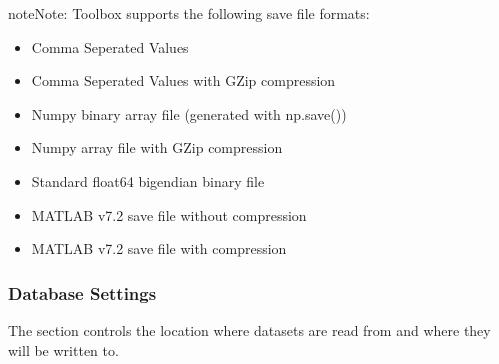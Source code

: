 \documentclass[letterpaper,10pt,english]{sphinxmanual}
\begin{document}
\begin{sphinxadmonition}{note}{Note:}
\sphinxAtStartPar
Toolbox supports the following save file formats:
\begin{itemize}
\item {} 
\sphinxAtStartPar
{} \sphinxhyphen{} Comma Seperated Values

\item {} 
\sphinxAtStartPar
{} \sphinxhyphen{} Comma Seperated Values with G\sphinxhyphen{}Zip compression

\item {} 
\sphinxAtStartPar
{} \sphinxhyphen{} Numpy binary array file (generated with np.save())

\item {} 
\sphinxAtStartPar
{} \sphinxhyphen{} Numpy array file with G\sphinxhyphen{}Zip compression

\item {} 
\sphinxAtStartPar
{} \sphinxhyphen{} Standard float64 big\sphinxhyphen{}endian binary file

\item {} 
\sphinxAtStartPar
{} \sphinxhyphen{} MATLAB v7.2 save file without compression

\item {} 
\sphinxAtStartPar
{} \sphinxhyphen{} MATLAB v7.2 save file with compression

\end{itemize}
\end{sphinxadmonition}


\subsubsection{Database Settings}
\label{\detokenize{usage/configuration:database-settings}}
\sphinxAtStartPar
The  section controls the location where datasets are read from and where they will be written to.
\end{document}
